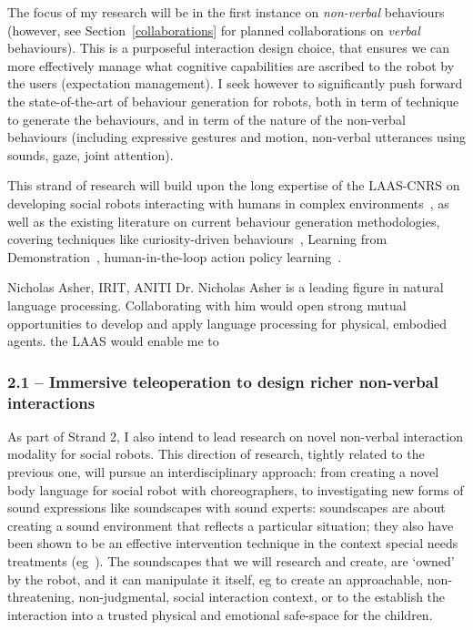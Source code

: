 The focus of my research will be in the first instance on \emph{non-verbal}
behaviours (however, see Section~\ref{collaborations} for planned collaborations
on \emph{verbal} behaviours). This is a purposeful interaction design choice,
that ensures we can more effectively manage what cognitive capabilities are
ascribed to the robot by the users (expectation management).  I seek however to
significantly push forward the state-of-the-art of behaviour generation for
robots, both in term of technique to generate the behaviours, and in term of the
nature of the non-verbal behaviours (including expressive gestures and motion,
non-verbal utterances using sounds, gaze, joint attention).

This strand of research will build upon the long expertise of the LAAS-CNRS on
developing social robots interacting with humans in complex
environments~\autocite{Lallement2014,gharbi2013natural,
waldhart2015planning}, as well as the
existing literature on current behaviour generation methodologies, covering
techniques like curiosity-driven behaviours~\parencite{oudeyer2005playground},
Learning from Demonstration~\autocite{billard2008robot, argall2009survey},
human-in-the-loop action policy learning~\autocite{senft2016sparc,
senft2019teaching}.

\begin{collaboration}{Nicholas Asher, IRIT, ANITI}
Dr. Nicholas Asher is a leading figure in natural language processing.
Collaborating with him would open strong mutual opportunities to develop and
apply language processing for physical, embodied agents.
the LAAS would enable me to 
\end{collaboration}


\subsubsection{2.1 -- Immersive teleoperation to design richer non-verbal
interactions}


As part of Strand 2, I also intend to lead research on novel non-verbal
interaction modality for social robots. This direction of research, tightly
related to the previous one, will pursue an interdisciplinary approach: from
creating a novel body language for social robot with choreographers, to
investigating new forms of sound expressions like soundscapes with sound
experts: soundscapes are about creating a sound environment that reflects a
particular situation; they also have been shown to be an effective intervention
technique in the context special needs treatments
(eg~\textcite{greher2010soundscape}). The soundscapes that we will research and
create, are `owned' by the robot, and it can manipulate it itself, eg to create
an approachable, non-threatening, non-judgmental, social interaction context, or
to the establish the interaction into a trusted physical and emotional
safe-space for the children.

